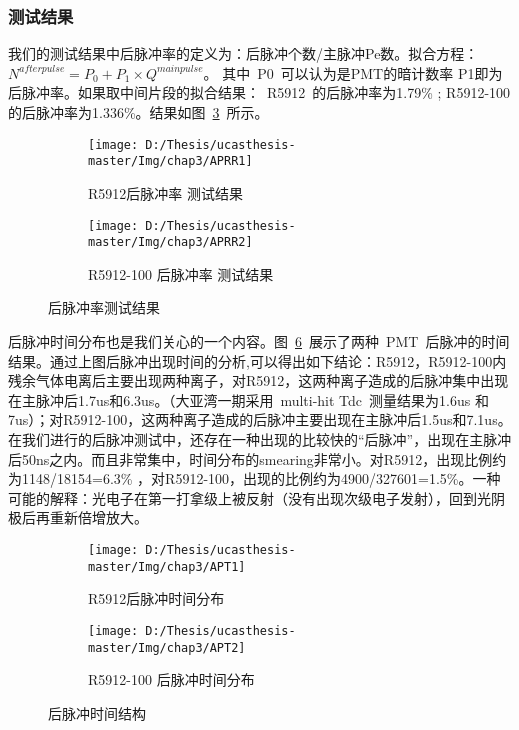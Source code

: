 \subsubsection{测试结果}
我们的测试结果中后脉冲率的定义为：后脉冲个数/主脉冲Pe数。拟合方程：$N^{afterpulse} = P_0 +P_1\times Q^{mainpulse}$。 其中~P0~可以认为是PMT的暗计数率  P1即为后脉冲率。如果取中间片段的拟合结果：~R5912~的后脉冲率为1.79\% ; R5912-100 的后脉冲率为1.336\%。结果如图~\ref{fig:APRR}~所示。
\begin{figure}[!htb]
  \centering
  \begin{subfigure}[b]{\MySubFactor\textwidth}
    \texttt{[image: D:/Thesis/ucasthesis-master/Img/chap3/APRR1]}
    \caption{R5912后脉冲率 测试结果}
    \label{fig:APRR_1}
  \end{subfigure}%
  \quad\quad\quad\quad%
  \begin{subfigure}[b]{\MySubFactor\textwidth}
    \texttt{[image: D:/Thesis/ucasthesis-master/Img/chap3/APRR2]}
    \caption{R5912-100 后脉冲率 测试结果}
    \label{fig:APRR_2}
  \end{subfigure}
  \caption{后脉冲率测试结果}
  \label{fig:APRR}
\end{figure}
后脉冲时间分布也是我们关心的一个内容。图~\ref{fig:APT}~展示了两种~PMT~后脉冲的时间结果。通过上图后脉冲出现时间的分析,可以得出如下结论：R5912，R5912-100内残余气体电离后主要出现两种离子，对R5912，这两种离子造成的后脉冲集中出现在主脉冲后1.7us和6.3us。（大亚湾一期采用~multi-hit Tdc~测量结果为1.6us 和 7us）；对R5912-100，这两种离子造成的后脉冲主要出现在主脉冲后1.5us和7.1us。在我们进行的后脉冲测试中，还存在一种出现的比较快的``后脉冲''，出现在主脉冲后50ns之内。而且非常集中，时间分布的smearing非常小。对R5912，出现比例约为1148/18154=6.3\% ，对R5912-100，出现的比例约为4900/327601=1.5\%。一种可能的解释：光电子在第一打拿级上被反射（没有出现次级电子发射），回到光阴极后再重新倍增放大。
\begin{figure}[!htb]
  \centering
  \begin{subfigure}[b]{\MySubFactor\textwidth}
    \texttt{[image: D:/Thesis/ucasthesis-master/Img/chap3/APT1]}
    \caption{R5912后脉冲时间分布}
    \label{fig:APT_1}
  \end{subfigure}%
  \quad\quad\quad\quad%
  \begin{subfigure}[b]{\MySubFactor\textwidth}
    \texttt{[image: D:/Thesis/ucasthesis-master/Img/chap3/APT2]}
    \caption{R5912-100 后脉冲时间分布}
    \label{fig:APT_2}
  \end{subfigure}
  \caption{后脉冲时间结构}
  \label{fig:APT}
\end{figure}
